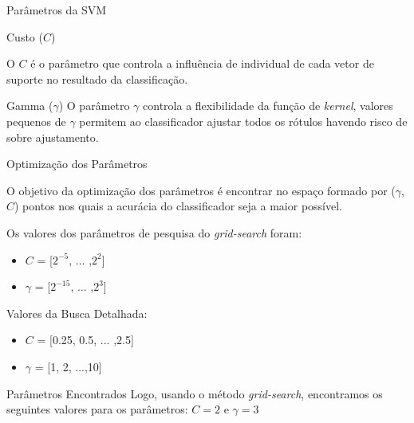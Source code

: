 \documentclass{beamer}
\begin{document}
\begin{frame}{Parâmetros da SVM}
   \begin{block}{Custo ($C$)}
   
   O $C$ é o parâmetro que controla a influência de individual de cada vetor de suporte no resultado da classificação. 
   
   
   \end{block}
   
   \begin{block}{Gamma ($\gamma$)}
   O parâmetro $\gamma$ controla a flexibilidade da função de \textit{kernel}, valores pequenos de $\gamma$ permitem ao classificador ajustar todos os rótulos havendo risco de sobre ajustamento. %
   
   \end{block}
\end{frame}

\begin{frame}{Optimização dos Parâmetros}
 \begin{block}{}
 O objetivo da optimização dos parâmetros é encontrar no espaço formado por ($\gamma$, $C$) pontos nos quais a acurácia do classificador seja a maior possível.
  
 Os valores dos parâmetros de pesquisa do \textit{grid-search} foram:
 \begin{itemize}
  \item $C$ = [$2^{-5}$, ... ,$2^2$]
  \item $\gamma$ = [$2^{-15}$, ... ,$2^3$]
 \end{itemize}

 Valores da Busca Detalhada:
  \begin{itemize}
   \item $C$ = [0.25, 0.5, ... ,2.5]
   \item $\gamma$ = [1, 2, ...,10]
  \end{itemize}
 \end{block}
 
 \begin{block}{Parâmetros Encontrados}
  Logo, usando o método \textit{grid-search}, encontramos os seguintes valores para os parâmetros: $C = 2$ e $\gamma = 3$
 \end{block}
\end{frame}
\end{document}
